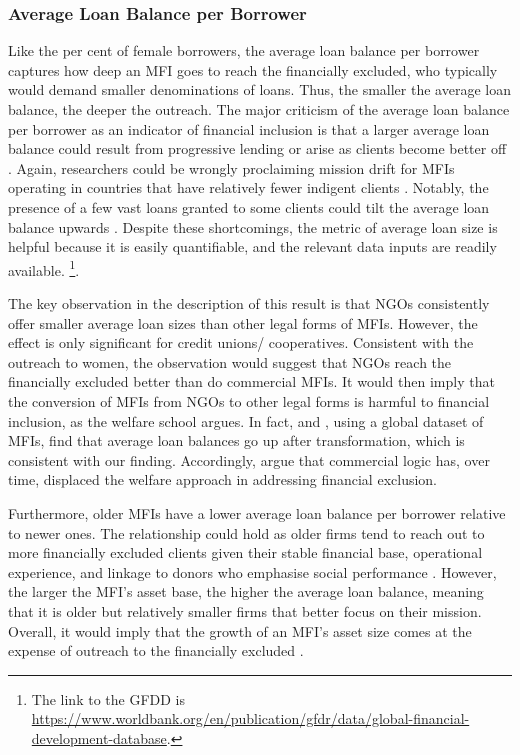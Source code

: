 \documentclass[a4paper, nobind]{templates/ociamthesis}
\begin{document}
\hypertarget{average-loan-balance-per-borrower}{%
\subsubsection{Average Loan Balance per Borrower}\label{average-loan-balance-per-borrower}}

Like the per cent of female borrowers, the average loan balance per borrower captures how deep an MFI goes to reach the financially excluded, who typically would demand smaller denominations of loans. Thus, the smaller the average loan balance, the deeper the outreach. The major criticism of the average loan balance per borrower as an indicator of financial inclusion is that a larger average loan balance could result from progressive lending or arise as clients become better off \autocite{abeysekera2014sustainability}. Again, researchers could be wrongly proclaiming mission drift for MFIs operating in countries that have relatively fewer indigent clients \autocite{armendariz2013subsidy}. Notably, the presence of a few vast loans granted to some clients could tilt the average loan balance upwards \autocite{market2014global}. Despite these shortcomings, the metric of average loan size is helpful because it is easily quantifiable, and the relevant data inputs are readily available. \footnote{The link to the GFDD is \url{https://www.worldbank.org/en/publication/gfdr/data/global-financial-development-database}.}.

The key observation in the description of this result is that NGOs consistently offer smaller average loan sizes than other legal forms of MFIs. However, the effect is only significant for credit unions/ cooperatives. Consistent with the outreach to women, the observation would suggest that NGOs reach the financially excluded better than do commercial MFIs. It would then imply that the conversion of MFIs from NGOs to other legal forms is harmful to financial inclusion, as the welfare school argues. In fact, \textcite{d2017ngos} and \textcite{mia2017mission}, using a global dataset of MFIs, find that average loan balances go up after transformation, which is consistent with our finding. Accordingly, \textcite{peck2001commercialization} argue that commercial logic has, over time, displaced the welfare approach in addressing financial exclusion.

Furthermore, older MFIs have a lower average loan balance per borrower relative to newer ones. The relationship could hold as older firms tend to reach out to more financially excluded clients given their stable financial base, operational experience, and linkage to donors who emphasise social performance \autocite{bos2015practice}. However, the larger the MFI's asset base, the higher the average loan balance, meaning that it is older but relatively smaller firms that better focus on their mission. Overall, it would imply that the growth of an MFI's asset size comes at the expense of outreach to the financially excluded \autocite{armendariz2013subsidy}.
\end{document}
